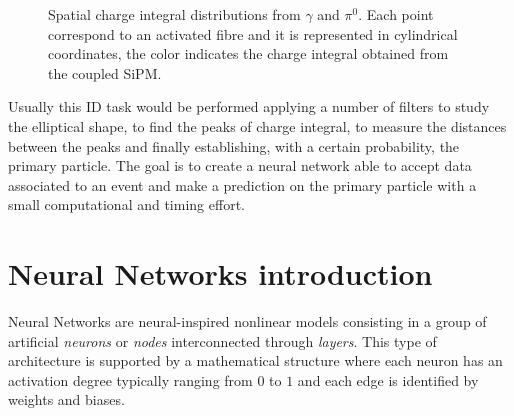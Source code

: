 \begin{figure}
	\centering
	 \quad
	\caption{Spatial charge integral distributions from $\gamma$ and $\pi^0$. Each point correspond to an activated fibre and it is represented in cylindrical coordinates, the color indicates the charge integral obtained from the coupled SiPM.}
	\label{fig:demo_shower}
\end{figure}

Usually this ID task would be performed applying a number of filters to study the elliptical shape, to find the peaks of charge integral, to measure the distances between the peaks and finally establishing, with a certain probability, the primary particle. The goal is to create a neural network able to accept data associated to an event and make a prediction on the primary particle with a small computational and timing effort.\\

\section{Neural Networks introduction}
Neural Networks are neural-inspired nonlinear models consisting in a group of artificial \textit{neurons} or \textit{nodes} interconnected through \textit{layers}. This type of architecture is supported by a mathematical structure where each neuron has an activation degree typically ranging from $0$ to $1$ and each edge is identified by weights and biases.\\

